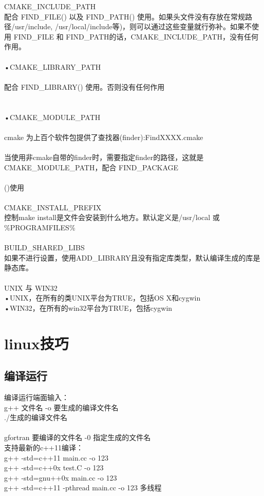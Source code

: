 \documentclass[11pt,a4paper,titlepage]{article}
\begin{document}
CMAKE\_INCLUDE\_PATH\\
配合 FIND\_FILE() 以及 FIND\_PATH() 使用。如果头文件没有存放在常规路径/usr/include, /usr/local/include等)，则可以通过这些变量就行弥补。如果不使用 FIND\_FILE 和 FIND\_PATH的话，CMAKE\_INCLUDE\_PATH，没有任何作用。\\
\\
•CMAKE\_LIBRARY\_PATH\\
\\
配合 FIND\_LIBRARY() 使用。否则没有任何作用\\
\\
 \\
•CMAKE\_MODULE\_PATH\\
\\
cmake 为上百个软件包提供了查找器(finder):FindXXXX.cmake\\
\\
当使用非cmake自带的finder时，需要指定finder的路径，这就是CMAKE\_MODULE\_PATH，配合 FIND\_PACKAGE\\
\\
()使用\\
\\
CMAKE\_INSTALL\_PREFIX\\
控制make install是文件会安装到什么地方。默认定义是/usr/local 或 \%PROGRAMFILES\%\\
\\
BUILD\_SHARED\_LIBS\\
如果不进行设置，使用ADD\_LIBRARY且没有指定库类型，默认编译生成的库是静态库。\\
\\
UNIX 与 WIN32\\
•UNIX，在所有的类UNIX平台为TRUE，包括OS X和cygwin\\
•WIN32，在所有的win32平台为TRUE，包括cygwin\\

\section{\kai linux技巧}
\subsection{\kai 编译运行}
编译运行端面输入：\\
g++ 文件名 -o 要生成的编译文件名\\
./生成的编译文件名\\
\\
gfortran 要编译的文件名 -0 指定生成的文件名\\
支持最新的c++11编译：\\
g++ -std=c++11 main.cc -o 123\\
g++ -std=c++0x test.C -o 123\\
g++ -std=gnu++0x main.cc -o 123\\
 g++ -std=c++11 -pthread main.cc -o 123 多线程\\
\end{document}

